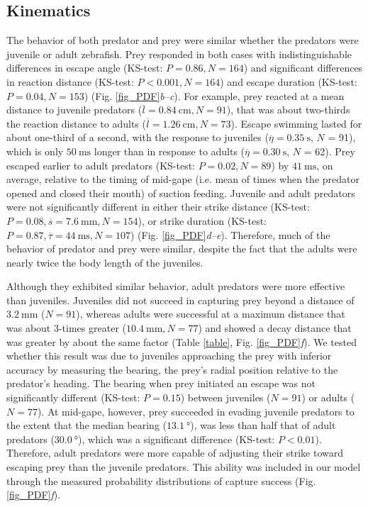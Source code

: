 \documentclass[]{rsos}%
\begin{document}
\subsection{Kinematics} %
The behavior of both predator and prey were similar whether the predators were juvenile or adult zebrafish.
Prey responded in both cases with indistinguishable differences in escape angle (KS-test: $P = 0.86, N = 164$) and significant differences in reaction distance (KS-test: $P < 0.001, N = 164$) and escape duration (KS-test: $P = 0.04, N = 153$) (Fig. \ref{fig_PDF}\textit{b--c}). 
For example, prey reacted at a mean distance to juvenile predators ($\overline{l} = \SI{0.84}{\cm}, N = 91$), that was about two-thirds the reaction distance to adults ($\overline{l} = \SI{1.26}{\cm}, N = 73$).
Escape swimming lasted for about one-third of a second, with the response to juveniles ($\overline{\eta} = \SI{0.35}{\s}$, $N$ = 91), which is only $\SI{50}{\ms}$ longer than in response to adults ($\overline{\eta} = \SI{0.30}{\s}$, $N$ = 62).
Prey escaped earlier to adult predators (KS-test: $P = 0.02, N = 89$) by $\SI{41}{\ms}$, on average, relative to the timing of mid-gape (i.e. mean of times when the predator opened and closed their mouth) of suction feeding.
Juvenile and adult predators were not significantly different in either their strike distance (KS-test: $P = 0.08, \overline{s} = \SI{7.6}{\mm}, N = 154$), or strike duration (KS-test: $P = 0.87, \overline{\tau} = \SI{44}{\ms}, N = 107$) (Fig. \ref{fig_PDF}\textit{d--e}).
Therefore, much of the behavior of predator and prey were similar, despite the fact that the adults were nearly twice the body length of the juveniles.

Although they exhibited similar behavior, adult predators were more effective than juveniles.
Juveniles did not succeed in capturing prey beyond a distance of $\SI{3.2}{\mm}$ ($N = 91$), whereas adults were successful at a maximum distance that was about 3-times greater ($\SI{10.4}{\mm}, N = 77$) and showed a decay distance that was greater by about the same factor (Table \ref{table}, Fig. \ref{fig_PDF}\textit{f}).
We tested whether this result was due to juveniles approaching the prey with inferior accuracy by measuring the bearing, the prey's radial position relative to the predator's heading.
The bearing when prey initiated an escape was not significantly different (KS-test: $P = 0.15$) between juveniles ($N = 91$) or adults ($N = 77$).
At mid-gape, however, prey succeeded in evading juvenile predators to the extent that the median bearing ($\SI{13.1}{\degree}$), was less than half that of adult predators ($\SI{30.0}{\degree}$), which was a significant difference (KS-test: $P < 0.01$).
Therefore, adult predators were more capable of adjusting their strike toward escaping prey than the juvenile predators. 
This ability was included in our model through the measured probability distributions of capture success (Fig. \ref{fig_PDF}\textit{f}).
\end{document}
